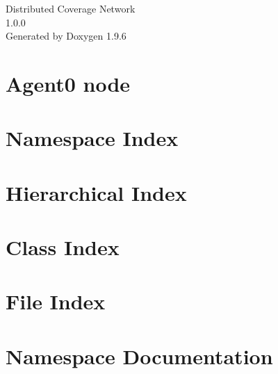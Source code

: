 \documentclass[twoside]{book}
\newcommand{\+}{\discretionary{\mbox{\scriptsize$\hookleftarrow$}}{}{}}
\newcommand{\clearemptydoublepage}{%
    \newpage{\pagestyle{empty}\cleardoublepage}%
  }
\begin{document}
  \raggedbottom
    \hypersetup{pageanchor=false,
                bookmarksnumbered=true,
                pdfencoding=unicode
               }
  \begin{titlepage}
  \vspace*{7cm}
  \begin{center}%
  {\Large Distributed Coverage Network}\\
  [1ex]\large 1.\+0.\+0 \\
  \vspace*{1cm}
  {\large Generated by Doxygen 1.9.6}\\
  \end{center}
  \end{titlepage}
  \clearemptydoublepage
  \tableofcontents
  \clearemptydoublepage
  \hypersetup{pageanchor=true}
\chapter{Agent0 node}
\label{index}\hypertarget{index}{}
\chapter{Namespace Index}

\chapter{Hierarchical Index}

\chapter{Class Index}

\chapter{File Index}

\chapter{Namespace Documentation}


\end{document}
